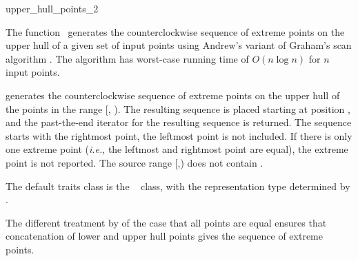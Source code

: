 

\begin{ccRefFunction}{upper_hull_points_2}  %

\ccDefinition
  
The function \ccRefName\ generates the counterclockwise sequence of extreme
points on the upper hull of a given set of input points using Andrew's
variant of Graham's scan algorithm \cite{a-aeach-79,m-mdscg-84}.  The algorithm
has worst-case running time of  $O(n \log n)$ for $n$ input points.


           {generates the counterclockwise sequence of extreme points
            on the upper hull of the points in the range [,
            ). The resulting sequence is placed starting at
            position , and the past-the-end iterator for
            the resulting sequence is returned.
            The sequence starts with the rightmost point,
            the leftmost point is not included.
            If there is only one extreme point ({\it i.e.}, the leftmost and
            rightmost point are equal), the extreme point is not reported.
            \ccPrecond%
            The source range [,) does not contain
            .}


The default traits class  is the \cgal\ 
 class,
with the representation type determined by .

The different treatment by  of the case that 
all points are equal ensures that concatenation of lower and upper hull 
points gives the sequence of extreme points.


\end{ccRefFunction}
